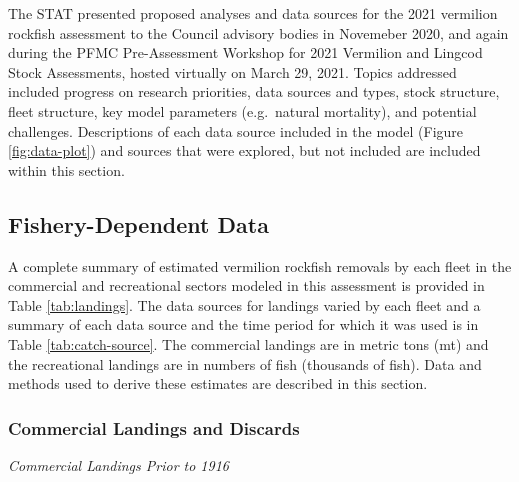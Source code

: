 \documentclass[
  english,
  a4paper,
]{article}
\begin{document}
The STAT presented proposed analyses and data sources for the 2021 vermilion rockfish
assessment to the Council advisory bodies in Novemeber 2020, and again during the PFMC Pre-Assessment Workshop for 2021 Vermilion and
Lingcod Stock Assessments, hosted virtually on March 29, 2021. Topics addressed
included progress on research priorities, data sources and types, stock structure,
fleet structure, key model parameters (e.g.~natural mortality), and potential
challenges. Descriptions of each data source included in the model
(Figure \ref{fig:data-plot}) and sources that were explored, but not included
are included within this section.

\hypertarget{fishery-dependent-data}{%
\subsection{Fishery-Dependent Data}\label{fishery-dependent-data}}

A complete summary of estimated vermilion rockfish removals by each fleet in the
commercial and recreational sectors modeled in this assessment is provided in Table
\ref{tab:landings}. The data sources for landings varied by each fleet and a summary
of each data source and the time period for which it was used is in Table \ref{tab:catch-source}.
The commercial landings are in metric tons (mt) and the recreational landings
are in numbers of fish (thousands of fish). Data and
methods used to derive these estimates are described in this section.

\hypertarget{commercial-landings-and-discards}{%
\subsubsection{Commercial Landings and Discards}\label{commercial-landings-and-discards}}

\emph{Commercial Landings Prior to 1916}
\end{document}
